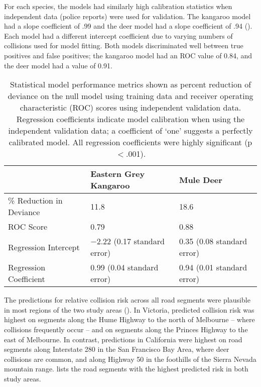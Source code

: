 For each species, the models had similarly high calibration statistics when independent data (police reports) were used for validation. The kangaroo model had a slope coefficient of .99 and the deer model had a slope coefficient of .94 (). Each model had a different intercept coefficient due to varying numbers of collisions used for model fitting. Both models discriminated well between true positives and false positives; the kangaroo model had an ROC value of 0.84, and the deer model had a value of 0.91.

\begin{table}[!h]
\caption[Statistical model performance for kangaroos and deer]{Statistical model performance metrics shown as percent reduction of deviance on the null model using training data and receiver operating characteristic (ROC) scores using independent validation data. Regression coefficients indicate model calibration when using the independent validation data; a coefficient of `one' suggests a perfectly calibrated model.  All regression coefficients were highly significant (p$<$.001).}
\centering
\begin{tabularx}{0.9\textwidth}{lll} \toprule
                        	&Eastern Grey Kangaroo			&Mule Deer \\ \midrule 
\% Reduction in Deviance 	& 11.8							& 18.6  \\ 
ROC Score 					& 0.79							& 0.88	\\ 
Regression Intercept 		& $-$2.22 (0.17 standard error)	& 0.35 (0.08 standard error) \\ 
Regression Coefficient 		& 0.99 (0.04 standard error)	& 0.94 (0.01 standard error) \\ 
\bottomrule
\end{tabularx}
\label{cal_model_perf}
\end{table}

The predictions for relative collision risk across all road segments were plausible in most regions of the two study areas ().  In Victoria, predicted collision risk was highest on segments along the Hume Highway to the north of Melbourne -- where collisions frequently occur -- and on segments along the Princes Highway to the east of Melbourne. In contrast, predictions in California were highest on road segments along Interstate 280 in the San Francisco Bay Area, where deer collisions are common, and along Highway 50 in the foothills of the Sierra Nevada mountain range.  lists the road segments with the highest predicted risk in both study areas.

